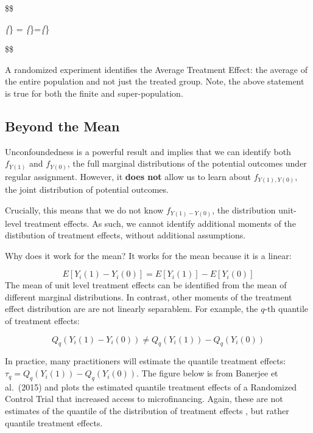\documentclass[
  letterpaper,
  DIV=11,
  numbers=noendperiod]{scrreprt}
\theoremstyle{definition}
\theoremstyle{remark}
\begin{document}
\$\$

\emph{\{}\} =
\emph{\{}\}=\emph{\{}\}

\$\$

A randomized experiment identifies the Average Treatment Effect: the
average of the entire population and not just the treated group. Note,
the above statement is true for both the finite and super-population.

\subsection{Beyond the Mean}\label{beyond-the-mean}

Unconfoundedness is a powerful result and implies that we can identify
both \(f_{Y(1)}\) and \(f_{Y(0)}\), the full marginal distributions of
the potential outcomes under regular assignment. However, it
\textbf{does not} allow us to learn about \(f_{Y(1),Y(0)}\), the joint
distribution of potential outcomes.

Crucially, this means that we do not know \(f_{Y(1)-Y(0)}\), the
distribution unit-level treatment effects. As such, we cannot identify
additional moments of the distibution of treatment effects, without
additional assumptions.

Why does it work for the mean? It works for the mean because it is a
linear:

\[
  E[Y_i(1)-Y_i(0)] = E[Y_i(1)]-E[Y_i(0)]
\] The mean of unit level treatment effects can be identified from the
mean of different marginal distributions. In contrast, other moments of
the treatment effect distribution are are not linearly separablem. For
example, the \(q\)-th quantile of treatment effects:

\[
  Q_q(Y_i(1)-Y_i(0)) \neq Q_q(Y_i(1))-Q_q(Y_i(0))
\]

In practice, many practitioners will estimate the quantile treatment
effects: \(\tau_q = Q_q(Y_i(1))-Q_q(Y_i(0))\). The figure below is from
Banerjee et al.~(2015) and plots the estimated quantile treatment
effects of a Randomized Control Trial that increased access to
microfinancing. Again, these are not estimates of the quantile of the
distribution of treatment effects , but rather quantile treatment
effects.
\end{document}
